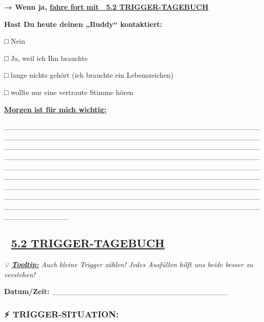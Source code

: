 \textbf{→ Wenn ja, \ul{fahre fort mit 🎢 5.2 TRIGGER-TAGEBUCH}}

\textbf{Hast Du heute deinen „Buddy`` kontaktiert:}

\textbf{□} Nein

□ Ja, weil ich Ihn brauchte

□ lange nichts gehört (ich brauchte ein Lebenszeichen)

□ wollte nur eine vertraute Stimme hören

\textbf{\ul{Morgen ist für mich wichtig:}}

\_\_\_\_\_\_\_\_\_\_\_\_\_\_\_\_\_\_\_\_\_\_\_\_\_\_\_\_\_\_\_\_\_\_\_\_\_\_\_\_\_\_\_\_\_\_\_\_\_\_\_\_\_\_\_\_\_\_\_\_\_\_\_\_\_\_\_\_\_\_\_\_\_\_\_\_\_\_\_\_\_\_\_\_\_\_\_\_\_\_\_\_\_\_\_\_\_\_\_\_\_\_\_\_\_\_\_\_\_\_\_\_\_\_\_\_\_\_\_\_\_\_\_\_\_\_\_\_\_\_\_\_\_\_\_\_\_\_\_\_\_\_\_\_\_\_\_\_\_\_\_\_\_\_\_\_\_\_\_\_\_\_\_\_\_\_\_\_\_\_\_\_\_\_\_\_\_\_\_\_\_\_\_\_\_\_\_\_\_\_\_\_\_\_\_\_\_\_\_\_\_\_\_\_\_\_\_\_\_\_\_\_\_\_\_\_\_\_\_\_\_\_\_\_\_\_\_\_\_\_\_\_\_\_\_\_\_\_\_\_\_\_\_\_\_\_\_\_\_\_\_\_\_\_\_\_\_\_\_\_\_\_\_\_\_\_\_\_\_\_\_\_\_\_\_\_\_\_\_\_\_\_\_\_\_\_\_\_\_\_\_\_\_\_\_\_\_\_\_\_\_\_\_\_\_\_\_\_\_\_\_\_\_\_\_\_\_\_\_\_\_\_\_\_\_\_\_\_\_\_\_\_\_\_\_\_\_\_\_\_\_\_\_\_\_\_\_\_\_\_\_\_\_\_\_\_\_\_\_\_\_\_\_\_\_\_\_\_\_\_\_\_\_\_\_\_\_\_\_\_\_\_\_\_\_\_\_\_\_\_\_\_\_\_\_\_\_\_\_\_\_\_\_\_\_\_\_\_\_\_\_\_\_\_\_\_\_\_\_\_\_\_\_\_\_\_\_\_\_\_\_\_\_\_\_\_\_\_\_\_\_\_\_\_

\hypertarget{section-2}{%
\subsection{}\label{section-2}}

\hypertarget{trigger-tagebuch}{%
\subsection{\texorpdfstring{🎢 \textbf{\ul{5.2 TRIGGER-TAGEBUCH}}}{🎢 5.2 TRIGGER-TAGEBUCH}}\label{trigger-tagebuch}}

\emph{💡 \textbf{\ul{Tooltip:}} Auch kleine Trigger zählen! Jedes Ausfüllen hilft uns beide besser zu verstehen!}

\textbf{Datum/Zeit:} \_\_\_\_\_\_\_\_\_\_\_\_\_\_\_\_\_\_\_\_\_\_\_\_\_\_\_\_\_\_\_\_\_

\hypertarget{trigger-situation}{%
\subsubsection{\texorpdfstring{\textbf{⚡ TRIGGER-SITUATION:}}{⚡ TRIGGER-SITUATION:}}\label{trigger-situation}}

